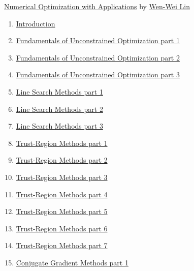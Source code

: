 \documentclass[11pt]{article}
\begin{document}
\newpage 

\begin{center}
	{\large  \href{https://www.youtube.com/playlist?list=PLbWe7cQA0ts8511K8Ni4y2wy0OhfCtw_C}{Numerical Optimization with Applications}} by {\large \href{https://sites.google.com/g2.nctu.edu.tw/wwlin}{Wen-Wei Lin}}
\end{center}

\vspace{-1cm}


\begin{enumerate}
	\item \href{https://mp.weixin.qq.com/s/X8QaEGTNlJerSQg7vkCvNA}{Introduction}	%
	\item \href{https://mp.weixin.qq.com/s/uiouygOffSN42a8-CVIFUQ}{Fundamentals of Unconstrained Optimization part 1}	%
	\item \href{https://mp.weixin.qq.com/s/ur4zRwAKdyp69SaRkAhLTg}{Fundamentals of Unconstrained Optimization part 2}	%
	\item \href{https://mp.weixin.qq.com/s/kopcQbjq-uVfQElB7Gjt7w}{Fundamentals of Unconstrained Optimization part 3}	%
	\item \href{https://mp.weixin.qq.com/s/qLAuJuILotvfRieHH-ndqQ}{Line Search Methods part 1}	%
	\item \href{https://mp.weixin.qq.com/s/TYLaKudstzRLmteZsfiwVg}{Line Search Methods part 2}	%
	\item \href{https://mp.weixin.qq.com/s/kK80-EJraQbFGRvBFjI3oA}{Line Search Methods part 3}	%
	\item \href{https://mp.weixin.qq.com/s/Gk_e5w29a4jjQ1Es3MZn0g}{Trust-Region Methods part 1}	%
	\item \href{https://mp.weixin.qq.com/s/yax9GDlkhzI16FSEyCEw1w}{Trust-Region Methods part 2}	%
	\item \href{https://mp.weixin.qq.com/s/FRlt7vAbQUzgdbBMH6XNdQ}{Trust-Region Methods part 3}	%
	\item \href{https://mp.weixin.qq.com/s/mwUDA_HIZpmukR83cKuu_g}{Trust-Region Methods part 4}	%
	\item \href{https://mp.weixin.qq.com/s/lLVbSby3LRmcJHPrjMz9eQ}{Trust-Region Methods part 5}	%
	\item \href{https://mp.weixin.qq.com/s/1DFKLP7UF6Iqhesic8tTtA}{Trust-Region Methods part 6}	%
	\item \href{https://mp.weixin.qq.com/s/UlYxtd_gZJdUzmC0ozBscw}{Trust-Region Methods part 7}	%
	\item \href{https://mp.weixin.qq.com/s/q_Puo7KvZYcWMP4N7EdIAQ}{Conjugate Gradient Methods part 1}	%

\end{enumerate}
\end{document}
